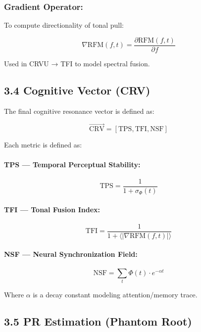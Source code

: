 \documentclass[10pt]{article}
\begin{document}
\subsubsection*{Gradient Operator:}
To compute directionality of tonal pull:

\begin{equation}
\nabla \text{RFM}(f, t) = \frac{\partial \text{RFM}(f, t)}{\partial f}
\end{equation}

Used in CRVU → TFI to model spectral fusion.

\subsection*{3.4 Cognitive Vector (CRV)}

The final cognitive resonance vector is defined as:

\begin{equation}
\vec{\text{CRV}} = [\text{TPS}, \text{TFI}, \text{NSF}]
\end{equation}

Each metric is defined as:

\paragraph{TPS — Temporal Perceptual Stability:}
\begin{equation}
\text{TPS} = \frac{1}{1 + \sigma_\Phi(t)}
\end{equation}

\paragraph{TFI — Tonal Fusion Index:}
\begin{equation}
\text{TFI} = \frac{1}{1 + \langle |\nabla \text{RFM}(f, t)| \rangle}
\end{equation}

\paragraph{NSF — Neural Synchronization Field:}
\begin{equation}
\text{NSF} = \sum_t \Phi(t) \cdot e^{-\alpha t}
\end{equation}

Where $\alpha$ is a decay constant modeling attention/memory trace.

\subsection*{3.5 PR Estimation (Phantom Root)}
\end{document}
